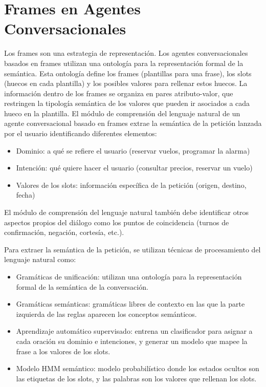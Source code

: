 \documentclass{report}
\begin{document}
\section{Frames en Agentes Conversacionales}
Los frames son una estrategia de representación. Los agentes conversacionales basados en frames utilizan una ontología para la representación formal de la semántica. Esta ontología define los frames (plantillas para una frase), los slots (huecos en cada plantilla) y los posibles valores para rellenar estos huecos. La información dentro de los frames se organiza en pares atributo-valor, que restringen la tipología semántica de los valores que pueden ir asociados a cada hueco en la plantilla. El módulo de comprensión del lenguaje natural de un agente conversacional basado en frames extrae la semántica de la petición lanzada por el usuario identificando diferentes elementos:
\begin{itemize}
    \item Dominio: a qué se refiere el usuario (reservar vuelos, programar la alarma)
    \item Intención: qué quiere hacer el usuario (consultar precios, reservar un vuelo)
    \item Valores de los slots: información específica de la petición (origen, destino, fecha)
\end{itemize}
El módulo de comprensión del lenguaje natural también debe identificar otros aspectos propios del diálogo como los puntos de coincidencia (turnos de confirmación, negación, cortesía, etc.).

Para extraer la semántica de la petición, se utilizan técnicas de procesamiento del lenguaje natural como:
\begin{itemize}
    \item Gramáticas de unificación: utilizan una ontología para la representación formal de la semántica de la conversación.
    \item Gramáticas semánticas: gramáticas libres de contexto en las que la parte izquierda de las reglas aparecen los conceptos semánticos.
    \item Aprendizaje automático supervisado: entrena un clasificador para asignar a cada oración su dominio e intenciones, y generar un modelo que mapee la frase a los valores de los slots.
    \item Modelo HMM semántico: modelo probabilístico donde los estados ocultos son las etiquetas de los slots, y las palabras son los valores que rellenan los slots.
\end{itemize}
 

\printbibliography
\end{document}
